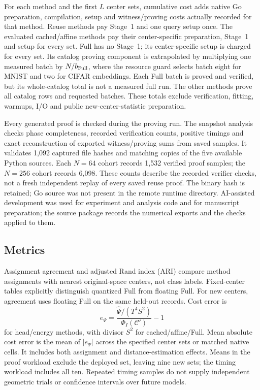 \documentclass[5p,times,twocolumn]{elsarticle}
\theoremstyle{plain}
\theoremstyle{definition}
\theoremstyle{remark}
\begin{document}
\par\endgroup
\begingroup\color{RevisionRed}
For each method and the first $L$ center sets, cumulative cost adds native Go preparation, compilation, setup and witness/proving costs actually recorded for that method. Reuse methods pay Stage~1 and one query setup once. The evaluated cached/affine methods pay their center-specific preparation, Stage~1 and setup for every set. Full has no Stage~1; its center-specific setup is charged for every set. Its catalog proving component is extrapolated by multiplying one measured batch by $N/b_{\rm Full}$, where the resource guard selects batch eight for MNIST and two for CIFAR embeddings. Each Full batch is proved and verified, but its whole-catalog total is not a measured full run. The other methods prove all catalog rows and requested batches. These totals exclude verification, fitting, warmups, I/O and public new-center-statistic preparation.


\par\endgroup
\begingroup\color{RevisionRed}
Every generated proof is checked during the proving run. The snapshot analysis checks phase completeness, recorded verification counts, positive timings and exact reconstruction of exported witness/proving sums from saved samples. It validates 1,092 captured file hashes and matching copies of the five available Python sources. Each $N=64$ cohort records 1,532 verified proof samples; the $N=256$ cohort records 6,098. These counts describe the recorded verifier checks, not a fresh independent replay of every saved reuse proof. The binary hash is retained; Go source was not present in the remote runtime directory. AI-assisted development was used for experiment and analysis code and for manuscript preparation; the source package records the numerical exports and the checks applied to them.


\par\endgroup
\subsection{\textcolor{RevisionRed}{Metrics}}
\begingroup\color{RevisionRed}
Assignment agreement and adjusted Rand index (ARI) compare method assignments with nearest original-space centers, not class labels. Fixed-center tables explicitly distinguish quantized Full from floating Full. For new centers, agreement uses floating Full on the same held-out records. Cost error is
\begin{equation}
e_\Psi=\frac{\widehat\Psi/(T^4S^2)}{\Phi_I(\mathcal C')}-1
\end{equation}
for head/energy methods, with divisor $S^2$ for cached/affine/Full. Mean absolute cost error is the mean of $|e_\Psi|$ across the specified center sets or matched native cells. It includes both assignment and distance-estimation effects. Means in the proof workload exclude the deployed set, leaving nine new sets; the timing workload includes all ten. Repeated timing samples do not supply independent geometric trials or confidence intervals over future models.
\end{document}
